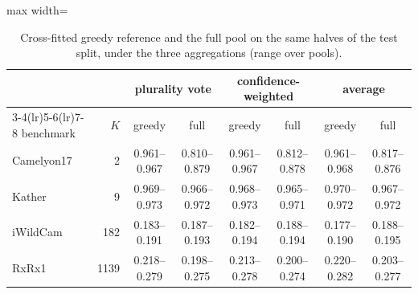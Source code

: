 \begin{table}[t]
\centering
\footnotesize
\caption{Cross-fitted greedy reference and the full pool on the same halves of the test split, under the three aggregations (range over pools).}
\label{tab:soft}
\setlength{\tabcolsep}{4pt}\begin{adjustbox}{max width=\linewidth}
\begin{tabular}{lrcccccc}
\toprule
& & \multicolumn{2}{c}{plurality vote} & \multicolumn{2}{c}{confidence-weighted} & \multicolumn{2}{c}{average} \\ \cmidrule(lr){3-4}\cmidrule(lr){5-6}\cmidrule(lr){7-8} benchmark & $K$ & greedy & full & greedy & full & greedy & full \\
\midrule
Camelyon17 & 2 & 0.961--0.967 & 0.810--0.879 & 0.961--0.967 & 0.812--0.878 & 0.961--0.968 & 0.817--0.876 \\
Kather & 9 & 0.969--0.973 & 0.966--0.972 & 0.968--0.973 & 0.965--0.971 & 0.970--0.972 & 0.967--0.972 \\
iWildCam & 182 & 0.183--0.191 & 0.187--0.193 & 0.182--0.194 & 0.188--0.194 & 0.177--0.190 & 0.188--0.195 \\
RxRx1 & 1139 & 0.218--0.279 & 0.198--0.275 & 0.213--0.278 & 0.200--0.274 & 0.220--0.282 & 0.203--0.277 \\
\bottomrule
\end{tabular}
\end{adjustbox}
\end{table}
